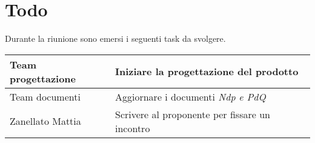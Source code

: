 \section{Todo}
Durante la riunione sono emersi i seguenti task da svolgere.

\begin{center}
  \begin{tabular}{|p{5cm}|p{7cm}|}
    \hline
    Team progettazione & Iniziare la progettazione del prodotto  \\ \hline
    Team documenti & Aggiornare i documenti \textit{Ndp e PdQ}   \\ \hline
    Zanellato Mattia & Scrivere al proponente per fissare un incontro   \\ \hline
  \end{tabular}
\end{center}
